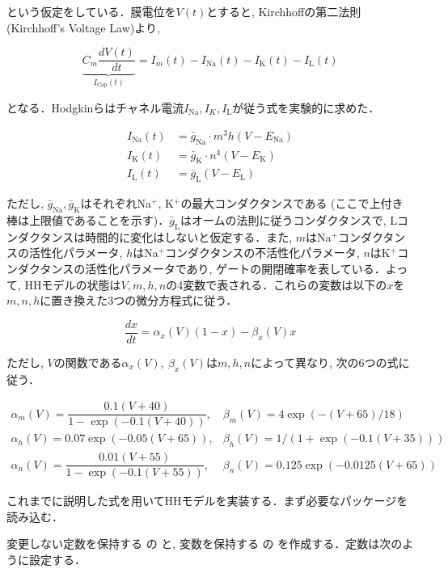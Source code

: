 という仮定をしている．膜電位を$V(t)$とすると, Kirchhoffの第二法則 (Kirchhoff's Voltage Law)より, 


\begin{equation}
\underbrace{C_m\frac {dV(t)}{dt}}_{I_\text{Cap} (t)}=I_{m}(t)-I_\text{Na}(t)-I_\text{K}(t)-I_\text{L}(t)
\end{equation}


となる．Hodgkinらはチャネル電流$I_\text{Na}, I_K, I_\text{L}$が従う式を実験的に求めた．


\begin{align}
I_\text{Na}(t) &= \bar{g}_{\text{Na}}\cdot m^{3}h(V-E_{\text{Na}})\\
I_\text{K}(t) &= \bar{g}_{\text{K}}\cdot n^{4}(V-E_{\text{K}})\\
I_\text{L}(t) &= \bar{g}_{\text{L}}(V-E_{\text{L}})
\end{align}


ただし, $\bar{g}_{\text{Na}}, \bar{g}_{\text{K}}$はそれぞれNa$^+$, K$^+$の最大コンダクタンスである (ここで上付き棒は上限値であることを示す)．$\bar{g}_{\text{L}}$はオームの法則に従うコンダクタンスで, Lコンダクタンスは時間的に変化はしないと仮定する．また, $m$はNa$^+$コンダクタンスの活性化パラメータ, $h$はNa$^+$コンダクタンスの不活性化パラメータ, $n$はK$^+$コンダクタンスの活性化パラメータであり, ゲートの開閉確率を表している．よって, HHモデルの状態は$V, m, h, n$の4変数で表される．これらの変数は以下の$x$を$m, n, h$に置き換えた3つの微分方程式に従う． 


\begin{equation}
\frac{dx}{dt}=\alpha_{x}(V)(1-x)-\beta_{x}(V)x
\end{equation}


ただし, $V$の関数である$\alpha_{x}(V),\ \beta_{x}(V)$は$m, h, n$によって異なり, 次の6つの式に従う．


\begin{equation}
\begin{array}{ll}
\alpha_{m}(V)=\dfrac {0.1(V+40)}{1-\exp (-0.1(V+40))}, &\beta_{m}(V)=4\exp {(-(V+65)/18)}\\
\alpha_{h}(V)=0.07\exp {(-0.05(V+65))}, & \beta_{h}(V)=1/(1+{\exp {\left(-0.1(V+35)\right)}})\\
\alpha_{n}(V)={\dfrac {0.01(V+55)}{1-\exp {\left(-0.1(V+55)\right)}}},& \beta_{n}(V)=0.125\exp {(-0.0125(V+65))} 
\end{array}
\end{equation}


これまでに説明した式を用いてHHモデルを実装する．まず必要なパッケージを読み込む．


変更しない定数を保持する  の  と, 変数を保持する  の  を作成する．定数は次のように設定する． 


